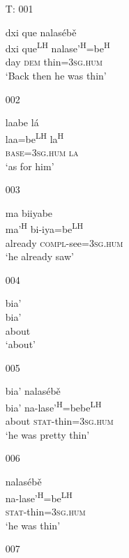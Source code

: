 

\begin{itemize}

\item[T: 001]
   
\glll dxi que nalas\'{e}b\v{e}\\
dxi que\textsuperscript{LH} nalase'\textsuperscript{H}=be\textsuperscript{H}\\
day \textsc{dem} thin=\textsc{3sg.hum}\\
\glt `Back then he was thin'


\item[002]
    
\glll laabe l\'{a}\\
laa=be\textsuperscript{LH} la\textsuperscript{H} \\
 \textsc{base}=\textsc{3sg.hum} \textsc{la}\\
\glt `as for him'
 

\item[003]
   
\glll ma biiyabe \\
ma'\textsuperscript{H} bi-iya=be\textsuperscript{LH} \\
already \textsc{compl}-see=\textsc{3sg.hum} \\
\glt `he already saw'
 

\item[004]
   
\glll bia'\\
bia'\\
about\\
\glt `about'
 

\item[005]
   
\glll bia' nalas\'{e}b\v{e}\\
bia' na-lase'\textsuperscript{H}=bebe\textsuperscript{LH} \\
about \textsc{stat}-thin=\textsc{3sg.hum}\\
\glt `he was pretty thin' 
 

\item[006]
   
\glll nalas\'{e}b\v{e}\\
na-lase'\textsuperscript{H}=be\textsuperscript{LH} \\
\textsc{stat}-thin=\textsc{3sg.hum}\\
\glt `he was thin'
 

\item[007]
   

\end{itemize}
